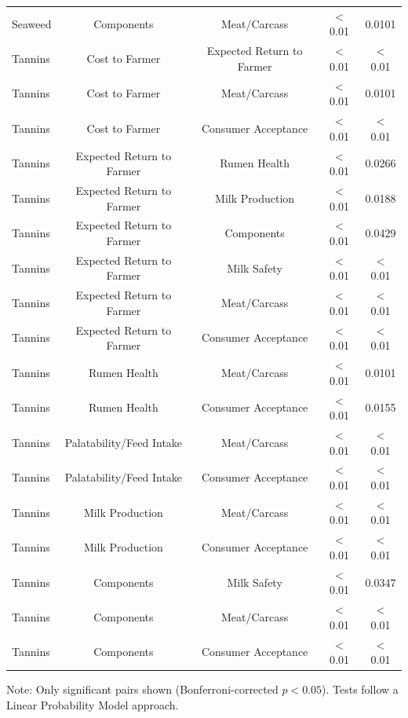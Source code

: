 \begin{table}
{\begin{threeparttable}
\begin{tabular}[t]{lcccc}
Seaweed & Components & Meat/Carcass & < 0.01 & 0.0101\\
Tannins & Cost to Farmer & Expected Return to Farmer & < 0.01 & < 0.01\\
Tannins & Cost to Farmer & Meat/Carcass & < 0.01 & 0.0101\\
\addlinespace
Tannins & Cost to Farmer & Consumer Acceptance & < 0.01 & < 0.01\\
Tannins & Expected Return to Farmer & Rumen Health & < 0.01 & 0.0266\\
Tannins & Expected Return to Farmer & Milk Production & < 0.01 & 0.0188\\
Tannins & Expected Return to Farmer & Components & < 0.01 & 0.0429\\
Tannins & Expected Return to Farmer & Milk Safety & < 0.01 & < 0.01\\
\addlinespace
Tannins & Expected Return to Farmer & Meat/Carcass & < 0.01 & < 0.01\\
Tannins & Expected Return to Farmer & Consumer Acceptance & < 0.01 & < 0.01\\
Tannins & Rumen Health & Meat/Carcass & < 0.01 & 0.0101\\
Tannins & Rumen Health & Consumer Acceptance & < 0.01 & 0.0155\\
Tannins & Palatability/Feed Intake & Meat/Carcass & < 0.01 & < 0.01\\
\addlinespace
Tannins & Palatability/Feed Intake & Consumer Acceptance & < 0.01 & < 0.01\\
Tannins & Milk Production & Meat/Carcass & < 0.01 & < 0.01\\
Tannins & Milk Production & Consumer Acceptance & < 0.01 & < 0.01\\
Tannins & Components & Milk Safety & < 0.01 & 0.0347\\
Tannins & Components & Meat/Carcass & < 0.01 & < 0.01\\
\addlinespace
Tannins & Components & Consumer Acceptance & < 0.01 & < 0.01\\
\bottomrule
\end{tabular}
\begin{tablenotes}
\item Note: Only significant pairs shown (Bonferroni-corrected $p < 0.05$). Tests follow a Linear Probability Model approach.
\end{tablenotes}
\end{threeparttable}}
\end{table}
